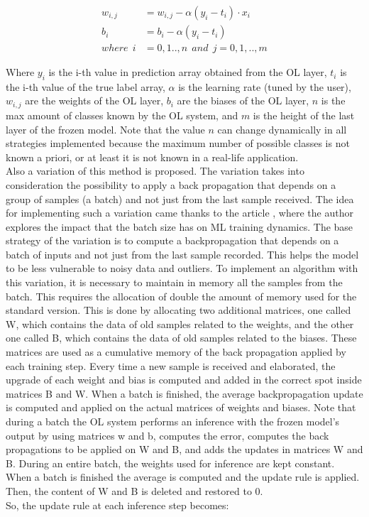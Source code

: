 \documentclass[12pt]{report}
\begin{document}
\begin{align}
    w_{i,j} &= w_{i,j} - \alpha (y_i - t_i) \cdot x_i \\
    b_i     &= b_i - \alpha (y_i - t_i) \\
    where \:\: i &= 0,1..,n  \: \: and \: \:  j=0,1,..,m \nonumber 
\end{align}

Where $y_i$ is the i-th value in prediction array obtained from the OL layer, $t_i$ is the i-th value of the true label array, $\alpha$ is the learning rate (tuned by the user), $w_{i,j}$ are the weights of the OL layer, $b_i$ are the biases of the OL layer, $n$ is the max amount of classes known by the OL system, and $m$ is the height of the last layer of the frozen model. Note that the value $n$ can change dynamically in all strategies implemented because the maximum number of possible classes is not known a priori, or at least it is not known in a real-life application. \\
Also a variation of this method is proposed. The variation takes into consideration the possibility to apply a back propagation that depends on a group of samples (a batch) and not just from the last sample received. The idea for implementing such a variation came thanks to the article \autocite{batch_size_medium}, where the author explores the impact that the batch size has on ML training dynamics. The base strategy of the variation is to compute a backpropagation that depends on a batch of inputs and not just from the last sample recorded. This helps the model to be less vulnerable to noisy data and outliers. To implement an algorithm with this variation, it is necessary to maintain in memory all the samples from the batch. This requires the allocation of double the amount of memory used for the standard version. This is done by allocating two additional matrices, one called W, which contains the data of old samples related to the weights, and the other one called B, which contains the data of old samples related to the biases. These matrices are used as a cumulative memory of the back propagation applied by each training step. Every time a new sample is received and elaborated, the upgrade of each weight and bias is computed and added in the correct spot inside matrices B and W. When a batch is finished, the average backpropagation update is computed and applied on the actual matrices of weights and biases. Note that during a batch the OL system performs an inference with the frozen model's output by using matrices w and b, computes the error, computes the back propagations to be applied on W and B, and adds the updates in matrices W and B. During an entire batch, the weights used for inference are kept constant. When a batch is finished the average is computed and the update rule is applied. Then, the content of W and B is deleted and restored to 0. \\
So, the update rule at each inference step becomes:
\end{document}
